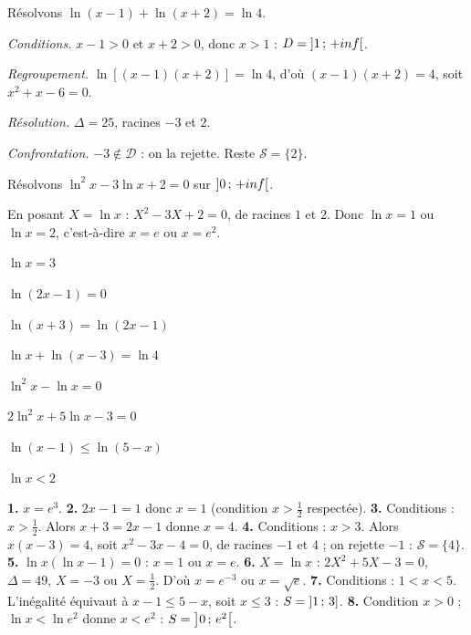\begin{exemple}
Résolvons $\ln(x-1)+\ln(x+2) = \ln 4$.

\emph{Conditions.} $x-1>0$ et $x+2>0$, donc $x>1$ :
$D = \left]1\,;\,+inf\right[$.

\emph{Regroupement.} $\ln\left[(x-1)(x+2)\right] = \ln 4$, d'où
$(x-1)(x+2) = 4$, soit $x^{2}+x-6 = 0$.

\emph{Résolution.} $\Delta = 25$, racines $-3$ et $2$.

\emph{Confrontation.} $-3 \notin \mathcal D$ : on la rejette. Reste
$\mathcal S = \{2\}$.
\end{exemple}

\begin{exemple}
Résolvons $\ln^{2}x-3\ln x+2 = 0$ sur $\left]0\,;\,+inf\right[$.

En posant $X = \ln x$ : $X^{2}-3X+2 = 0$, de racines $1$ et $2$. Donc
$\ln x = 1$ ou $\ln x = 2$, c'est-à-dire $x = e$ ou $x = e^{2}$.
\end{exemple}

\begin{entrainement}
\exo[\niveau{1}] $\ln x = 3$

\exo[\niveau{1}] $\ln(2x-1) = 0$

\exo[\niveau{2}] $\ln(x+3) = \ln(2x-1)$

\exo[\niveau{2}] $\ln x+\ln(x-3) = \ln 4$

\exo[\niveau{2}] $\ln^{2}x-\ln x = 0$

\exo[\niveau{3}] $2\ln^{2}x+5\ln x-3 = 0$

\exo[\niveau{3}] $\ln(x-1) \leq \ln(5-x)$

\exo[\niveau{3}] $\ln x < 2$
\end{entrainement}

\begin{corrige}
\textbf{1.} $x = e^{3}$.
\textbf{2.} $2x-1 = 1$ donc $x = 1$ (condition $x>\frac12$ respectée).
\textbf{3.} Conditions : $x>\frac12$. Alors $x+3 = 2x-1$ donne $x = 4$.
\textbf{4.} Conditions : $x>3$. Alors $x(x-3) = 4$, soit $x^{2}-3x-4 = 0$,
de racines $-1$ et $4$ ; on rejette $-1$ : $\mathcal S = \{4\}$.
\textbf{5.} $\ln x(\ln x-1) = 0$ : $x = 1$ ou $x = e$.
\textbf{6.} $X = \ln x$ : $2X^{2}+5X-3 = 0$, $\Delta = 49$, $X = -3$ ou
$X = \frac12$. D'où $x = e^{-3}$ ou $x = \sqrt e$.
\textbf{7.} Conditions : $1<x<5$. L'inégalité équivaut à $x-1 \leq 5-x$,
soit $x \leq 3$ : $S = \left]1\,;\,3\right]$.
\textbf{8.} Condition $x>0$ ; $\ln x<\ln e^{2}$ donne $x<e^{2}$ :
$S = \left]0\,;\,e^{2}\right[$.
\end{corrige}

